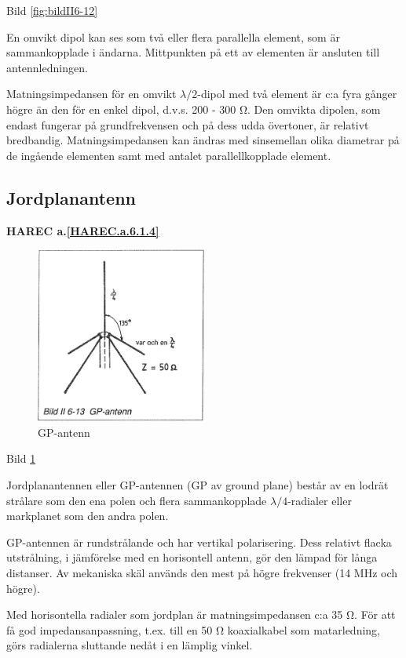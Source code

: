Bild \ref{fig:bildII6-12}

En omvikt dipol kan ses som två eller flera parallella element, som är
sammankopplade i ändarna. Mittpunkten på ett av elementen är ansluten
till antennledningen.

Matningsimpedansen för en omvikt \(\lambda/2\)-dipol med två element är
c:a fyra gånger högre än den för en enkel dipol, d.v.s. 200 - 300
Ω. Den omvikta dipolen, som endast fungerar på grundfrekvensen och på
dess udda övertoner, är relativt bredbandig. Matningsimpedansen kan
ändras med sinsemellan olika diametrar på de ingående elementen samt
med antalet parallellkopplade element.

\subsection{Jordplanantenn}
\textbf{
HAREC a.\ref{HAREC.a.6.1.4}\label{myHAREC.a.6.1.4}
}

\begin{figure}
  \includegraphics[width=0.5\textwidth]{images/bild_2_6-13}
  \caption{GP-antenn}
  \label{fig:bildII6-13}
\end{figure}

Bild \ref{fig:bildII6-13}

Jordplanantennen eller GP-antennen (GP av ground plane) består av en
lodrät strålare som den ena polen och flera sammankopplade
\(\lambda/4\)-radialer eller markplanet som den andra polen.

GP-antennen är rundstrålande och har vertikal polarisering. Dess
relativt flacka utstrålning, i jämförelse med en horisontell antenn,
gör den lämpad för långa distanser.  Av mekaniska skäl används den
mest på högre frekvenser (14 MHz och högre).

Med horisontella radialer som jordplan är matningsimpedansen c:a 35
Ω. För att få god impedansanpassning, t.ex. till en 50 Ω koaxialkabel
som matarledning, görs radialerna sluttande nedåt i en lämplig vinkel.

